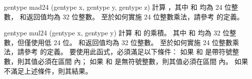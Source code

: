 gentype mad24 (gentype x, 
		gentype y,
		gentype z)
\stopbuffer
{}
計算 ，其中  和  均為 24 位整數，
 和返回值均為 32 位整數。
至於如何實施 24 位整數乘法，請參考  的定義。
\stopbuffer

gentype mul24 (gentype x,
		gentype y)
\stopbuffer
{}
計算  和  的乘積。
其中  和  均為 32 位整數，但僅使用低 24 位。
 和返回值均為 32 位整數。
至於如何實施 24 位整數乘法，請參考  的定義。
要使用此函式，必須滿足以下條件：
如果  和  是帶符號整數，則其值必須在區間 \math{[-2^{23}, 2^{23}-1]} 內；
如果  和  是無符號整數，則其值必須在區間 \math{[0, 2^{24}-1]} 內。
如果不滿足上述條件，則其結果。
\stopbuffer

\startCLFD


\stopCLFD

